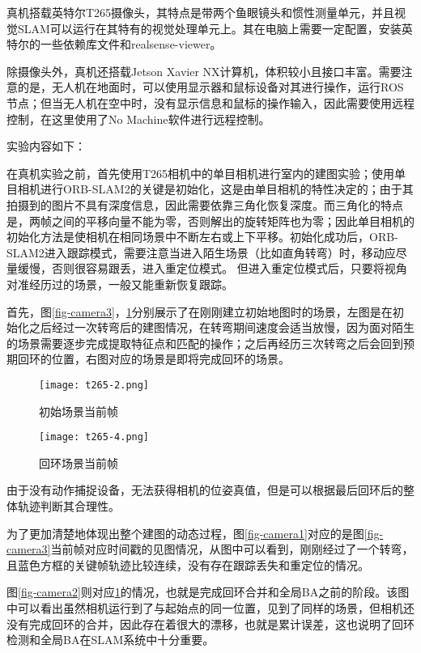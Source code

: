 真机搭载英特尔T265摄像头，其特点是带两个鱼眼镜头和惯性测量单元，并且视觉SLAM可以运行在其特有的视觉处理单元上。其在电脑上需要一定配置，安装英特尔的一些依赖库文件和realsense-viewer。

除摄像头外，真机还搭载Jetson Xavier NX计算机，体积较小且接口丰富。需要注意的是，无人机在地面时，可以使用显示器和鼠标设备对其进行操作，运行ROS节点；但当无人机在空中时，没有显示信息和鼠标的操作输入，因此需要使用远程控制，在这里使用了No Machine软件进行远程控制。

实验内容如下：

在真机实验之前，首先使用T265相机中的单目相机进行室内的建图实验；使用单目相机进行ORB-SLAM2的关键是初始化，这是由单目相机的特性决定的；由于其拍摄到的图片不具有深度信息，因此需要依靠三角化恢复深度。而三角化的特点是，两帧之间的平移向量不能为零，否则解出的旋转矩阵也为零；因此单目相机的初始化方法是使相机在相同场景中不断左右或上下平移。初始化成功后，ORB-SLAM2进入跟踪模式，需要注意当进入陌生场景（比如直角转弯）时，移动应尽量缓慢，否则很容易跟丢，进入重定位模式。
但进入重定位模式后，只要将视角对准经历过的场景，一般又能重新恢复跟踪。

首先，图\ref{fig-camera3}，\ref{fig-camera4}分别展示了在刚刚建立初始地图时的场景，左图是在初始化之后经过一次转弯后的建图情况，在转弯期间速度会适当放慢，因为面对陌生的场景需要逐步完成提取特征点和匹配的操作；之后再经历三次转弯之后会回到预期回环的位置，右图对应的场景是即将完成回环的场景。

\begin{figure}[htbp]
	\centering
	\begin{minipage}[t]{0.4\columnwidth} %
		\centering
		\texttt{[image: t265-2.png]}
		\caption{初始场景当前帧}
		\label{fig-camera3}
	\end{minipage}
	\begin{minipage}[t]{0.4\columnwidth}
		\centering
		\texttt{[image: t265-4.png]}
		\caption{回环场景当前帧}
		\label{fig-camera4}
	\end{minipage}
\end{figure}

由于没有动作捕捉设备，无法获得相机的位姿真值，但是可以根据最后回环后的整体轨迹判断其合理性。

为了更加清楚地体现出整个建图的动态过程，图\ref{fig-camera1}对应的是图\ref{fig-camera3}当前帧对应时间戳的见图情况，从图中可以看到，刚刚经过了一个转弯，且蓝色方框的关键帧轨迹比较连续，没有存在跟踪丢失和重定位的情况。

图\ref{fig-camera2}则对应\ref{fig-camera4}的情况，也就是完成回环合并和全局BA之前的阶段。该图中可以看出虽然相机运行到了与起始点的同一位置，见到了同样的场景，但相机还没有完成回环的合并，因此存在着很大的漂移，也就是累计误差，这也说明了回环检测和全局BA在SLAM系统中十分重要。



